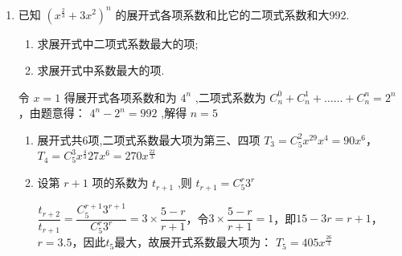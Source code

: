 \begin{enumerate}
\item 已知 $(x^{\frac{2}{3}}+3x^{2})^{n}$ 的展开式各项系数和比它的二项式系数和大992. 
\begin{enumerate}
    \item 求展开式中二项式系数最大的项; 
    \item 求展开式中系数最大的项. 
\end{enumerate}
\begin{jieda}
    令 $x = 1$ 得展开式各项系数和为 ${4}^{n}$ ,二项式系数为 ${C}_{n}^{0} + {C}_{n}^{1} + \ldots \ldots  + {C}_{n}^{n} = {2}^{n}$，由题意得： ${4}^{n} - {2}^{n} = {992}$ ,解得 $n = 5$
    \begin{enumerate}
        \item 展开式共6项,二项式系数最大项为第三、四项
        ${T}_{3} = C_5^2x^29x^4 = 90x^6$，$T_4 = C_5^3x^\frac{4}{3}27x^6 = 270x^\frac{22}{3}$
        \item 设第 $r + 1$ 项的系数为 ${t}_{r + 1}$ ,则 ${t}_{r + 1} = {C}_{5}^{r}{3}^{r}$
        
        $\dfrac{{t}_{r + 2}}{{t}_{r + 1}} = \dfrac{C_5^{r+1}3^{r+1}}{{C}_{5}^{r}{3}^{r}} = 3 \times \dfrac{5-r}{r+1}$，令$3 \times \dfrac{5-r}{r+1} = 1$，即$15-3r = r+1$，$r = 3.5$，因此$t_5$最大，故展开式系数最大项为： ${T}_{5} = {405}x^\frac{26}{3}$
    \end{enumerate}
\end{jieda}
\end{enumerate}
